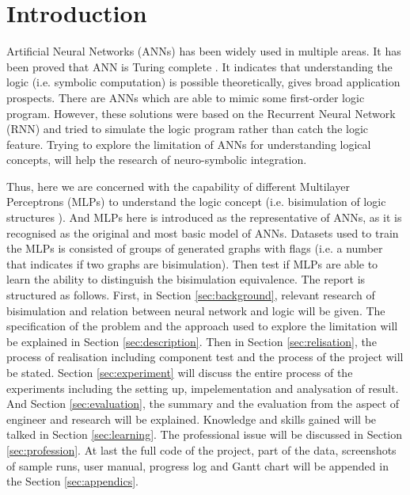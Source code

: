 \section{Introduction}


Artificial Neural Networks (ANNs) has been widely used in multiple areas. 
It has been proved that ANN is Turing complete \cite{siegelmann1995computational}. 
It indicates that understanding the logic (i.e. symbolic computation) is possible theoretically, gives broad application prospects.
There are ANNs \cite{holldobler1999approximating, Holldobler91towardsa} which are able to mimic some first-order logic program. 
However, these solutions were based on the Recurrent Neural Network (RNN) and tried to simulate the logic program rather than catch the logic feature. 
Trying to explore the limitation of ANNs for understanding logical concepts, will help the research of neuro-symbolic integration.

Thus, here we are concerned with the capability of different  Multilayer Perceptrons (MLPs) to understand the logic concept (i.e. bisimulation of logic structures ). 
And MLPs here is introduced as the representative of ANNs, as it is recognised as the original and most basic model of ANNs.
Datasets used to train the MLPs is consisted of groups of generated graphs with flags (i.e. a number that indicates if two graphs are bisimulation).
Then test if MLPs are able to learn the ability to distinguish the bisimulation equivalence.
The report is structured as follows.
First, in Section \ref{sec:background}, relevant research of bisimulation and relation between neural network and logic will be given. 
The specification of the problem and the approach used to explore the limitation will be explained in Section \ref{sec:description}.
Then in Section \ref{sec:relisation}, the process of realisation including component test and the process of the project will be stated.
Section \ref{sec:experiment} will discuss the entire process of the experiments including the setting up, impelementation and analysation of result.
And Section \ref{sec:evaluation}, the summary and the evaluation from the aspect of engineer and research will be explained.
Knowledge and skills gained will be talked in Section \ref{sec:learning}.
The professional issue will be discussed in Section \ref{sec:profession}.
At last the full code of the project, part of the data, screenshots of sample runs, user manual, progress log and Gantt chart will be appended in the Section \ref{sec:appendics}.